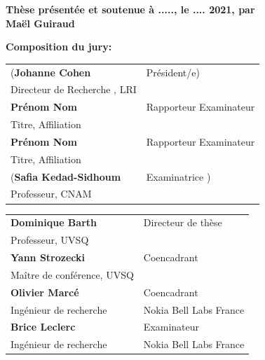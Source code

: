 \begin{titlepage}
\textbf{Thèse présentée et soutenue à ....., le .... 2021, par}\\
\bigskip
\Large {\color{Prune} \textbf{Maël Guiraud}}


\vspace{\fill} %

\flushleft \small \textbf{Composition du jury:}
\bigskip



\scriptsize
\begin{tabular}{|p{8cm}l}
\arrayrulecolor{Prune}
(\textbf{Johanne Cohen} &   Président/e)\\ 
Directeur de Recherche , LRI & \\
\textbf{Prénom Nom} &  Rapporteur Examinateur\\ 
Titre, Affiliation   &   \\ 
\textbf{Prénom Nom} &  Rapporteur Examinateur\\ 
Titre, Affiliation  &   \\ 
(\textbf{Safia Kedad-Sidhoum} &  Examinatrice )\\ 
Professeur, CNAM   &   \\ 



\end{tabular} 

\medskip
\begin{tabular}{|p{8cm}l}\arrayrulecolor{white}
\textbf{Dominique Barth} &   Directeur de thèse\\ 
Professeur, UVSQ & \\
\textbf{Yann Strozecki} &   Coencadrant\\ 
Maître de conférence, UVSQ  &   \\ 
\textbf{Olivier Marcé} &  Coencadrant \\ 
Ingénieur de recherche  & Nokia Bell Labs France  \\ 
\textbf{Brice Leclerc} &  Examinateur \\ 
Ingénieur de recherche  & Nokia Bell Labs France  \\ 

\end{tabular} 


\end{titlepage}
\ifthispageodd{\newpage\thispagestyle{empty}\null\newpage}{}
\thispagestyle{empty}
\selectfont

